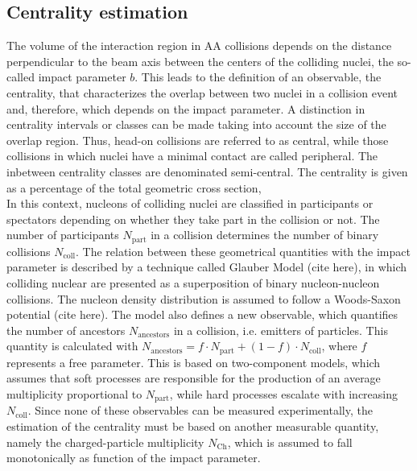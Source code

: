 \documentclass[12pt,a4paper]{report}
\begin{document}
\subsection{Centrality estimation}
\label{centEstim}
The volume of the interaction region in AA collisions depends on the distance perpendicular to the beam axis between the centers of the colliding nuclei, the so-called impact parameter $b$. This leads to the definition of an observable, the centrality, that characterizes the overlap between two nuclei in a collision event and, therefore,  which depends on the impact parameter. A distinction in centrality intervals or classes can be made taking into account the size of the overlap region. Thus, head-on collisions are referred to as central, while those collisions in which nuclei have a minimal contact are called peripheral. The inbetween centrality classes are denominated semi-central. The centrality is given as a percentage of the total geometric cross section, \\
In this context, nucleons of colliding nuclei are classified in participants or spectators depending on whether they take part in the collision or not. The number of participants $N_\text{part}$ in a collision determines the number of binary collisions $N_\text{coll}$. The relation between these geometrical quantities with the impact parameter is described by a technique called Glauber Model (cite here), in which colliding nuclear are presented as a superposition of binary nucleon-nucleon collisions. The nucleon density distribution is assumed to follow a Woods-Saxon potential (cite here). The model also defines a new observable, which quantifies the number of ancestors $N_\text{ancestors}$ in a collision, i.e. emitters of particles. This quantity is calculated with $N_\text{ancestors} = f \cdot N_\text{part} + (1 - f)\cdot N_\text{coll} $, where $f$ represents a free parameter. This is based on two-component models, which assumes that soft processes are responsible for the production of an average multiplicity proportional to $N_\text{part}$, while hard processes escalate with increasing $N_\text{coll}$. Since none of these observables can be measured experimentally, the estimation of the centrality must be based on another measurable quantity, namely the charged-particle multiplicity $N_\text{Ch}$, which is assumed to fall monotonically as function of the impact parameter.\\ %
\end{document}
